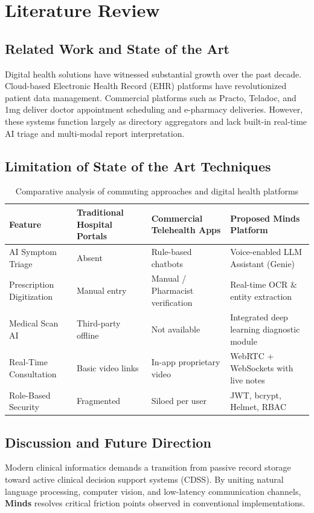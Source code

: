 \documentclass[12pt,a4paper]{report}
\begin{document}
\chapter{Literature Review}

\section{Related Work and State of the Art}
Digital health solutions have witnessed substantial growth over the past decade. Cloud-based Electronic Health Record (EHR) platforms have revolutionized patient data management. Commercial platforms such as Practo, Teladoc, and 1mg deliver doctor appointment scheduling and e-pharmacy deliveries. However, these systems function largely as directory aggregators and lack built-in real-time AI triage and multi-modal report interpretation.

\section{Limitation of State of the Art Techniques}
\begin{table}[htbp]
\centering
\caption{Comparative analysis of commuting approaches and digital health platforms}
\label{tab:lit_comparison}
\begin{tabularx}{\textwidth}{p{3.2cm} X X X}
\toprule
\textbf{Feature} & \textbf{Traditional Hospital Portals} & \textbf{Commercial Telehealth Apps} & \textbf{Proposed Minds Platform} \\
\midrule
AI Symptom Triage & Absent & Rule-based chatbots & Voice-enabled LLM Assistant (Genie) \\
Prescription Digitization & Manual entry & Manual / Pharmacist verification & Real-time OCR \& entity extraction \\
Medical Scan AI & Third-party offline & Not available & Integrated deep learning diagnostic module \\
Real-Time Consultation & Basic video links & In-app proprietary video & WebRTC + WebSockets with live notes \\
Role-Based Security & Fragmented & Siloed per user & JWT, bcrypt, Helmet, RBAC \\
\bottomrule
\end{tabularx}
\end{table}

\section{Discussion and Future Direction}
Modern clinical informatics demands a transition from passive record storage toward active clinical decision support systems (CDSS). By uniting natural language processing, computer vision, and low-latency communication channels, \textbf{Minds} resolves critical friction points observed in conventional implementations.
\end{document}
